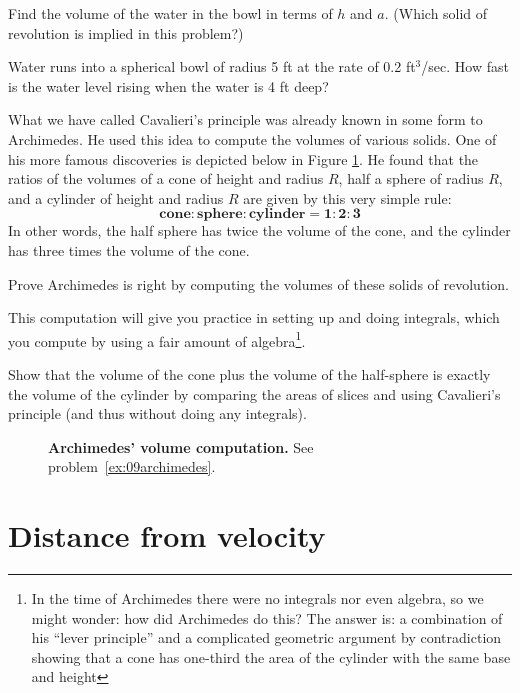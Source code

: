 \begin{multicols}{2}
\subprob  Find the volume of the water in the bowl in terms of $h$ and $a$.  (Which
solid of revolution is implied in this problem?)

\subprob  Water runs into a spherical bowl of radius 5 ft at
the rate of 0.2 ft${}^3$/sec. How fast is the water level rising
when the water is 4 ft deep?

\problem \label{ex:09archimedes} %
What we have called Cavalieri's principle was already known in some
form to Archimedes.  He used this idea to compute the volumes of
various solids.  One of his more famous discoveries is depicted below
in Figure \ref{fig:09archimedes-sphere-cone-cylinder}.  He found that
the ratios of the volumes of a cone of height and radius $R$,
half a sphere of radius $R$, and a cylinder of height and
radius $R$ are given by this very simple rule:
\[
  \textbf{cone}:
  \textbf{sphere}:
  \textbf{cylinder}
  =
  \textbf{1}:\textbf{2}:\textbf{3}
\]
In other words, the half sphere has twice the volume of the cone, and the
cylinder has three times the volume of the cone.

\subprob Prove Archimedes is right by computing the volumes of these solids
of revolution.  

\smallskip

This computation will give you practice in setting up and doing integrals, which
you compute by using a fair amount of algebra\footnote{In the time of Archimedes there were no integrals nor even algebra, so we might wonder: how did Archimedes do this? The answer is: a combination of his ``lever principle'' and a complicated geometric argument by contradiction showing that a cone has one-third the area of the cylinder with the same base and height}.

\carefulnow\subprob Show that the volume of the cone plus the volume of the half-sphere is
exactly the volume of the cylinder by comparing the areas of slices and using
Cavalieri's principle (and thus without doing any integrals).

\end{multicols}
\noproblemfont
\begin{figure}[h]
  \centering 
  \caption{\textbf{Archimedes' volume computation. }  See
    problem~\ref{ex:09archimedes}.}
  \label{fig:09archimedes-sphere-cone-cylinder}
\end{figure}

\section{Distance from velocity} %

